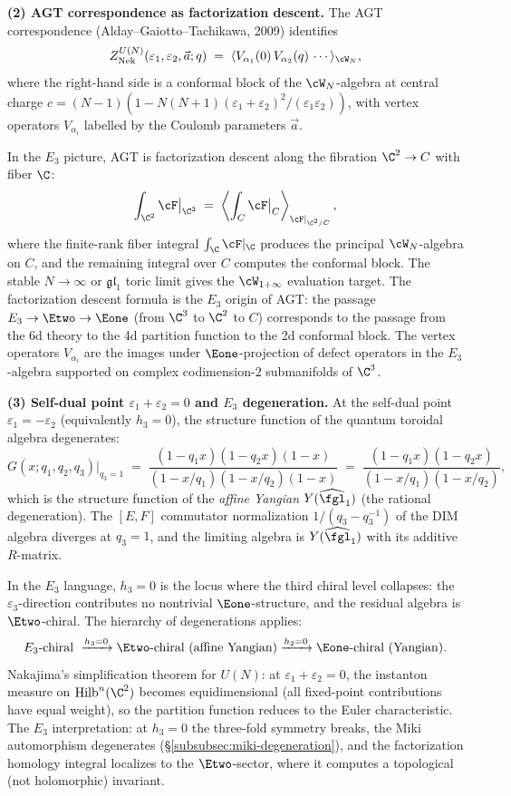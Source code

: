 \medskip
\noindent\textbf{(2) AGT correspondence as factorization descent.}
The AGT correspondence (Alday--Gaiotto--Tachikawa, 2009) identifies
\begin{equation}
 Z_{\mathrm{Nek}}^{U(N)}(\varepsilon_1, \varepsilon_2, \vec{a}; q) \;=\; \langle V_{\alpha_1}(0) \, V_{\alpha_2}(q) \, \cdots \rangle_{\cW_N},
 \label{eq:agt}
\end{equation}
where the right-hand side is a conformal block of the $\cW_N$-algebra at central charge $c = (N-1)(1 - N(N+1)(\varepsilon_1 + \varepsilon_2)^2/(\varepsilon_1 \varepsilon_2))$, with vertex operators $V_{\alpha_i}$ labelled by the Coulomb parameters $\vec{a}$.

In the $E_3$ picture, AGT is factorization descent along the fibration $\C^2 \to C$ with fiber $\C$:
\[
 \int_{\C^2} \cF\big|_{\C^2} \;=\; \left\langle \int_C \cF\big|_C \right\rangle_{\cF|_{\C^2/C}},
\]
where the finite-rank fiber integral $\int_\C \cF|_\C$ produces the principal $\cW_N$-algebra on $C$, and the remaining integral over $C$ computes the conformal block. The stable \(N\to\infty\) or \(\mathfrak{gl}_1\) toric limit gives the $\cW_{1+\infty}$ evaluation target. The factorization descent formula is the $E_3$ origin of AGT: the passage $E_3 \to \Etwo \to \Eone$ (from $\C^3$ to $\C^2$ to $C$) corresponds to the passage from the 6d theory to the 4d partition function to the 2d conformal block. The vertex operators $V_{\alpha_i}$ are the images under $\Eone$-projection of defect operators in the $E_3$-algebra supported on complex codimension-$2$ submanifolds of $\C^3$.

\medskip
\noindent\textbf{(3) Self-dual point $\varepsilon_1 + \varepsilon_2 = 0$ and $E_3$ degeneration.}
At the self-dual point $\varepsilon_1 = -\varepsilon_2$ (equivalently $h_3 = 0$), the structure function of the quantum toroidal algebra degenerates:
\[
 G(x; q_1, q_2, q_3)\big|_{q_3 = 1} \;=\; \frac{(1 - q_1 x)(1 - q_2 x)(1 - x)}{(1 - x/q_1)(1 - x/q_2)(1 - x)} \;=\; \frac{(1 - q_1 x)(1 - q_2 x)}{(1 - x/q_1)(1 - x/q_2)},
\]
which is the structure function of the \emph{affine Yangian} $Y(\widehat{\fgl}_1)$ (the rational degeneration). The $[E, F]$ commutator normalization $1/(q_3 - q_3^{-1})$ of the DIM algebra diverges at $q_3 = 1$, and the limiting algebra is $Y(\widehat{\fgl}_1)$ with its additive $R$-matrix.

In the $E_3$ language, $h_3 = 0$ is the locus where the third chiral level collapses: the $\varepsilon_3$-direction contributes no nontrivial $\Eone$-structure, and the residual algebra is $\Etwo$-chiral. The hierarchy of degenerations applies:
\[
 E_3\text{-chiral } \xrightarrow{h_3 = 0} \Etwo\text{-chiral (affine Yangian)} \xrightarrow{h_2 = 0} \Eone\text{-chiral (Yangian)}.
\]
Nakajima's simplification theorem for $U(N)$: at $\varepsilon_1 + \varepsilon_2 = 0$, the instanton measure on $\mathrm{Hilb}^n(\C^2)$ becomes equidimensional (all fixed-point contributions have equal weight), so the partition function reduces to the Euler characteristic. The $E_3$ interpretation: at $h_3 = 0$ the three-fold symmetry breaks, the Miki automorphism degenerates (\S\ref{subsubsec:miki-degeneration}), and the factorization homology integral localizes to the $\Etwo$-sector, where it computes a topological (not holomorphic) invariant.

